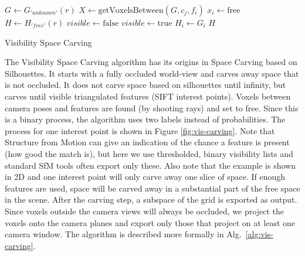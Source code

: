 {\singlespacing
\begin{algorithm}[!h]
  \centering
  \begin{algorithmic}[1]
     
      \State $G \gets G_{'unknown'}(r)$ 
         
          \State $X \gets \mathrm{getVoxelsBetween}(G, c_j, f_i)$ 
            \State $x_i \gets \mathrm{free}$ 
          \EndFor
        \EndFor
      \EndFor
      \State $H \gets H_{'free'}(r)$ 
        \State $visible \gets \mathrm{false}$
            \State $visible \gets \mathrm{true}$
          \EndIf
        \EndFor
          \State $H_i \gets G_i$ 
        \EndIf
      \EndFor
      \State \Return $H$
    \EndFunction
  \end{algorithmic}
  \caption{Visibility Space Carving}
  \label{alg:vis-carving}
\end{algorithm}
}

The Visibility Space Carving algorithm has its origins in Space Carving based on Silhouettes. It starts with a fully occluded world-view and carves away space that is not occluded. It does not carve space based on silhouettes until infinity, but carves until visible triangulated features (\ie SIFT interest points). Voxels between camera poses and features are found (\ie by shooting rays) and set to free. Since this is a binary process, the algorithm uses two labels instead of probabilities. The process for one interest point is shown in Figure \ref{fig:vis-carving}. Note that Structure from Motion can give an indication of the chance a feature is present (\ie how good the match is), but here we use thresholded, binary visibility lists and standard SfM tools often export only these. Also note that the example is shown in 2D and one interest point will only carve away one slice of space. If enough features are used, space will be carved away in a substantial part of the free space in the scene. After the carving step, a subspace of the grid is exported as output. Since voxels outside the camera views will always be occluded, we project the voxels onto the camera planes and export only those that project on at least one camera window. The algorithm is described more formally in Alg.~\ref{alg:vis-carving}.


